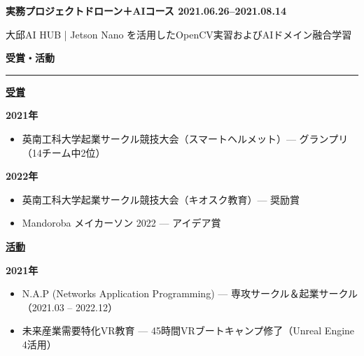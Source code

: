 \documentclass[a4paper, 10pt]{article}
\newcommand{\resumesection}[1]{%
  \vspace{8pt}
  \noindent
  {\large\bfseries #1}
  \vspace{2pt}
  \noindent\hrule
  \vspace{4pt}
}
\begin{document}
\vspace{3pt}
\noindent
\textbf{\japanesefont 実務プロジェクトドローン＋AIコース \hfill 2021.06.26--2021.08.14}

\noindent
{\small \japanesefont 大邱AI HUB | Jetson Nano を活用したOpenCV実習およびAIドメイン融合学習}


\resumesection{\japanesefont 受賞・活動}

\vspace{2pt}
\noindent
\textbf{\underline{\japanesefont 受賞}}

\vspace{2pt}
\noindent
\textbf{\japanesefont 2021年}

\begin{itemize}
  \setlength{\itemsep}{1pt}
  \setlength{\parskip}{0pt}
  \item \japanesefont 英南工科大学起業サークル競技大会（スマートヘルメット）— グランプリ（14チーム中2位）
\end{itemize}

\vspace{2pt}
\noindent
\textbf{\japanesefont 2022年}

\begin{itemize}
  \setlength{\itemsep}{1pt}
  \setlength{\parskip}{0pt}
  \item \japanesefont 英南工科大学起業サークル競技大会（キオスク教育）— 奨励賞
  \item \japanesefont Mandoroba メイカーソン 2022 — アイデア賞
\end{itemize}

\vspace{4pt}
\noindent
\textbf{\underline{\japanesefont 活動}}

\vspace{2pt}
\noindent
\textbf{\japanesefont 2021年}

\begin{itemize}
  \setlength{\itemsep}{1pt}
  \setlength{\parskip}{0pt}
  \item \japanesefont N.A.P (Networks Application Programming) — 専攻サークル＆起業サークル（2021.03 -- 2022.12）
  \item \japanesefont 未来産業需要特化VR教育 — 45時間VRブートキャンプ修了（Unreal Engine 4活用）
\end{itemize}
\end{document}
